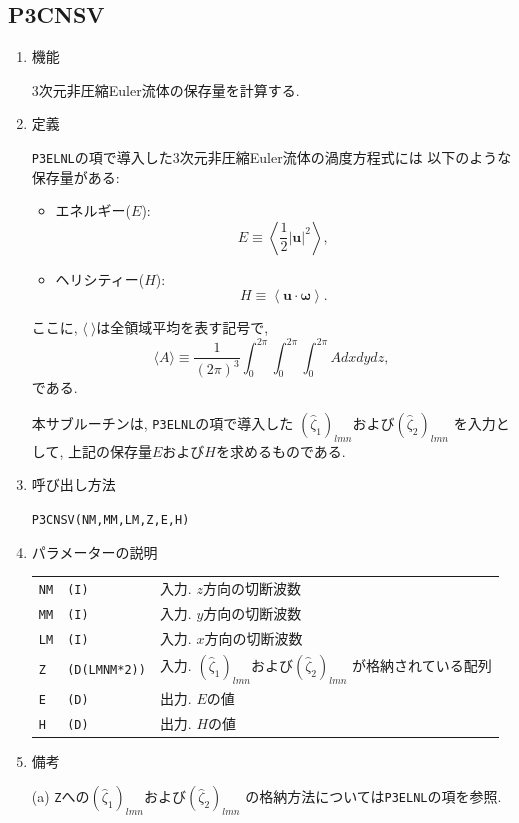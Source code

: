 \documentclass[a4j,fleqn]{jarticle}
\begin{document}

\subsection{P3CNSV}

\begin{enumerate}

\item 機能

3次元非圧縮Euler流体の保存量を計算する.

\item 定義

{\tt P3ELNL}の項で導入した3次元非圧縮Euler流体の渦度方程式には
以下のような保存量がある:
\begin{itemize}
\item エネルギー($E$):
\begin{equation}
E\equiv\left\langle\frac12|\boldsymbol{u}|^2\right\rangle,
\end{equation}
\item ヘリシティー($H$):
\begin{equation}
H\equiv\left\langle\boldsymbol{u}\cdot\boldsymbol{\omega}
\right\rangle.
\end{equation}
\end{itemize}
ここに, $\langle\ \rangle$は全領域平均を表す記号で,
\begin{equation}
\langle A\rangle\equiv\frac1{(2\pi)^3}\int^{2\pi}_0\int^{2\pi}_0\int^{2\pi}_0
A dxdydz,
\end{equation}
である.

本サブルーチンは,
{\tt P3ELNL}の項で導入した
$(\hat{\zeta}_1)_{lmn}$および$(\hat{\zeta}_2)_{lmn}$
を入力として, 上記の保存量$E$および$H$を求めるものである.

\item 呼び出し方法

{\tt P3CNSV(NM,MM,LM,Z,E,H)}
  
\item パラメーターの説明

\begin{tabular}{lll}
{\tt NM} & {\tt (I)} & 入力. $z$方向の切断波数\\
{\tt MM} & {\tt (I)} & 入力. $y$方向の切断波数\\
{\tt LM} & {\tt (I)} & 入力. $x$方向の切断波数\\
{\tt Z} & {\tt (D(LMNM*2))} &
 入力. $(\hat{\zeta}_1)_{lmn}$および$(\hat{\zeta}_2)_{lmn}$
  が格納されている配列\\
{\tt E} & {\tt (D)} & 出力. $E$の値\\
{\tt H} & {\tt (D)} & 出力. $H$の値
\end{tabular}

\item 備考

(a) {\tt Z}への$(\hat{\zeta}_1)_{lmn}$および$(\hat{\zeta}_2)_{lmn}$
の格納方法については{\tt P3ELNL}の項を参照.

\end{enumerate}
\end{document}
